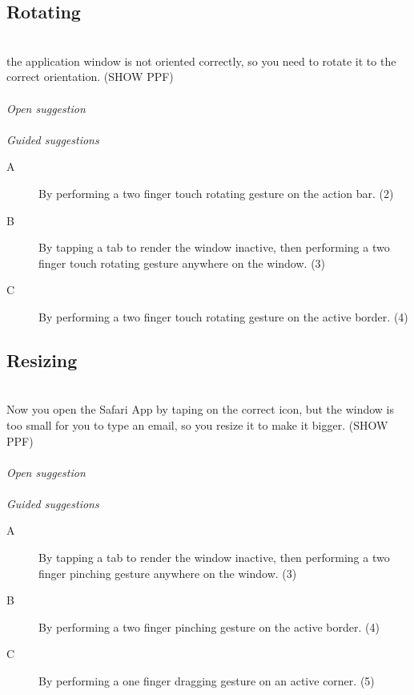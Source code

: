 
\subsection{Rotating}
\hfill\\
the application window is not oriented correctly, so you need to rotate it to the correct orientation. 
(SHOW PPF)
\\\\
\emph{Open suggestion}
\\\\
\emph{Guided suggestions}
\begin{description}
\item[A]{By performing a two finger touch rotating gesture on the action bar. (2)}
\item[B]{By tapping a tab to render the window inactive, then performing a two finger touch rotating gesture anywhere on the window. (3)}
\item[C]{By performing a two finger touch rotating gesture on the active border. (4)}
\end{description}


\subsection{Resizing}
\hfill\\
Now you open the Safari App by taping on the correct icon, but the window is too small for you to type an email, so you resize it to make it bigger.
(SHOW PPF)
\\\\
\emph{Open suggestion}
\\\\
\emph{Guided suggestions}
\begin{description}
\item[A]{By tapping a tab to render the window inactive, then performing a two finger pinching gesture anywhere on the window. (3)}
\item[B]{By performing a two finger pinching gesture on the active border. (4)}
\item[C]{By performing a one finger dragging gesture on an active corner. (5)}
\end{description}



